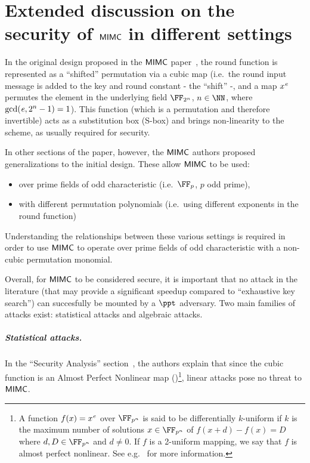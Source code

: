 
\chapter{Extended discussion on the security of $\mathsf{MIMC{}}$ in different settings}\label{appendix:mimc-security}

In the original design proposed in the $\mathsf{MIMC{}}$ paper~\cite{albrecht2016mimc}, the round function is represented as a ``shifted'' permutation via a cubic map (i.e.~the round input message is added to the key and round constant - the ``shift'' -, and a map $x^{\mathit{e}{}}$ permutes the element in the underlying field $\FFx{2^n}$, $n \in \NN$, where $\gcd(\mathit{e}{}, 2^n - 1) = 1$). This function (which is a permutation and therefore invertible) acts as a substitution box (S-box) and brings non-linearity to the scheme, as usually required for security.

In other sections of the paper, however, the $\mathsf{MIMC{}}$ authors proposed generalizations to the initial design. These allow $\mathsf{MIMC{}}$ to be used:
\begin{itemize}
    \item over prime fields of odd characteristic (i.e.~$\FFx{p}$, $p$ odd prime),
    \item with different permutation polynomials (i.e.~using different exponents in the round function)
\end{itemize}

Understanding the relationships between these various settings is required in order to use $\mathsf{MIMC{}}$ to operate over prime fields of odd characteristic with a non-cubic permutation monomial.

Overall, for $\mathsf{MIMC{}}$ to be considered secure, it is important that no attack in the literature (that may provide a significant speedup compared to ``exhaustive key search'') can succesfully be mounted by a $\ppt$ adversary. Two main families of attacks exist: statistical attacks and algebraic attacks.

\paragraph{Statistical attacks.}

In the ``Security Analysis'' section~\cite[Section 4.2]{albrecht2016mimc}, the authors explain that since the cubic function is an Almost Perfect Nonlinear map (\apn)\footnote{A function $f(x) = x^{\mathit{e}{}}$ over $\FFx{p^n}$ is said to be differentially $k$-uniform if $k$ is the maximum number of solutions $x \in \FFx{p^n}$ of $f(x + d) - f (x) = D$ where $d, D \in \FFx{p^n}$ and $d \neq 0$. If $f$ is a 2-uniform mapping, we say that $f$ is almost perfect nonlinear. See e.g.~\cite{DBLP:journals/tit/HellesethRS99} for more information.}, linear attacks pose no threat to $\mathsf{MIMC{}}$.

